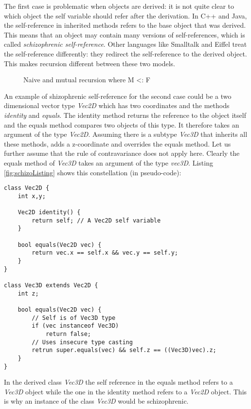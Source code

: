 The first case is problematic when objects are derived: it is not quite
clear to which object the self variable should refer after the derivation.
In C++ and Java, the self-reference in inherited methods refers to
the base object that was derived. This means that an object may contain
many versions of self-references, which is called \emph{schizophrenic
self-reference}. Other languages like Smalltalk and Eiffel treat the
self-reference differently: they redirect the self-reference to the
derived object. This makes recursion different between these two models.

\begin{figure}
	\centering
	\caption{Naive and mutual recursion where M <: F}
	\label{fig:schizoRecursion}
\end{figure}

An example of shizophrenic self-reference for the second case could be
a two dimensional vector type \emph{Vec2D} which has two coordinates
and the methods \emph{identity} and \emph{equals}. The identity method
returns the reference to the object itself and the equals method
compares two objects of this type. It therefore takes an argument
of the type \emph{Vec2D}. Assuming there is a subtype \emph{Vec3D}
that inherits all these methods, adds a z-coordinate and overrides the
equals method. Let us further assume that the rule of contravariance
does not apply here. Clearly the equals method of \emph{Vec3D} takes
an argument of the type \emph{vec3D}. Listing \ref{fig:schizoListing}
shows this constellation (in pseudo-code):

\begin{lstlisting}[float,caption={An example of schizophrenic self-reference},label={fig:schizoListing}]
class Vec2D {
	int x,y;

	Vec2D identity() {
		return self; // A Vec2D self variable
	}

	bool equals(Vec2D vec) {
		return vec.x == self.x && vec.y == self.y;
	}
}

class Vec3D extends Vec2D {
	int z;

	bool equals(Vec2D vec) {
		// Self is of Vec3D type
		if (vec instanceof Vec3D)
			return false;
		// Uses insecure type casting
		retrun super.equals(vec) && self.z == ((Vec3D)vec).z;
	}
}
\end{lstlisting}

In the derived class \emph{Vec3D} the self reference in the equals 
method refers to a \emph{Vec3D} object while the one in the identity method
refers to a \emph{Vec2D} object. This is why an instance of the class
\emph{Vec3D} would be schizophrenic.

